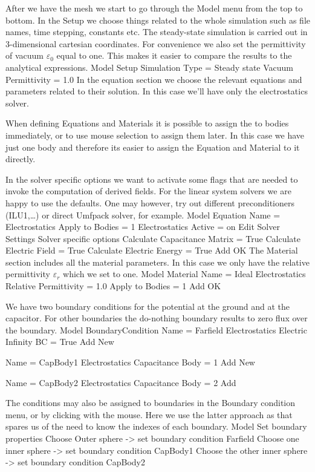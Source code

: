 After we have the mesh we start to go through the Model menu from the top to bottom. 
In the Setup we choose things related to the whole simulation such as file names, 
time stepping, constants etc.
The steady-state simulation is carried out in 3-dimensional cartesian
coordinates. For convenience we also set the permittivity of vacuum $\varepsilon_0$ equal to one.
This makes it easier to compare the results to the analytical expressions. 
\ttbegin
Model
  Setup 
    Simulation Type = Steady state
    Vacuum Permittivity = 1.0
\ttend
In the equation section we choose the relevant equations and parameters related to their solution. 
In this case we'll have only the electrostatics solver. 

When defining Equations and Materials it is possible to assign the to bodies immediately, or to use mouse
selection to assign them later. In this case we have just one body and therefore its easier to assign 
the Equation and Material to it directly.

In the solver specific options we want to activate some flags that are needed to invoke the 
computation of derived fields. 
For the linear system solvers we are happy to use the defaults. One may however, try out different
preconditioners (ILU1,\ldots) or direct Umfpack solver, for example.
\ttbegin
Model
  Equation
    Name = Electrostatics
    Apply to Bodies = 1
    Electrostatics
      Active = on
      Edit Solver Settings
        Solver specific options
          Calculate Capacitance Matrix = True
          Calculate Electric Field = True
          Calculate Electric Energy = True
    Add 
    OK
\ttend        
The Material section includes all the material parameters.
In this case we only have the relative permittivity $\varepsilon_r$ which we set to one.
\ttbegin
Model
  Material
    Name = Ideal
    Electrostatics
      Relative Permittivity = 1.0
    Apply to Bodies = 1 
    Add
    OK
\ttend

We have two boundary conditions for the potential at the ground and at the capacitor. For other boundaries
the do-nothing boundary results to zero flux over the boundary.
\ttbegin
Model
  BoundaryCondition
    Name = Farfield
    Electrostatics
      Electric Infinity BC = True
    Add
    New

    Name = CapBody1
    Electrostatics
      Capacitance Body = 1
    Add
    New

    Name = CapBody2
    Electrostatics
      Capacitance Body = 2
    Add
\ttend   

The conditions may also be assigned to boundaries in the Boundary condition menu, or 
by clicking with the mouse. Here we use the latter approach as that spares us of the 
need to know the indexes of each boundary.
\ttbegin
Model
  Set boundary properties
    Choose Outer sphere -> set boundary condition Farfield
    Choose one inner sphere -> set boundary condition CapBody1
    Choose the other inner sphere -> set boundary condition CapBody2
\ttend

